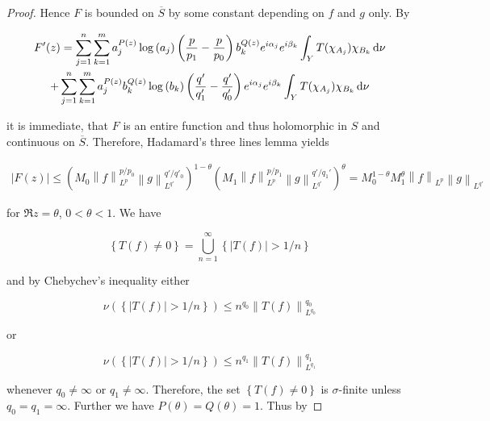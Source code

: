 \begin{proof}
Hence $F$ is bounded on $\overline{S}$ by some constant depending on $f$ and $g$ only. By 

\begin{multline*}
	F'(z) = \sum_{j = 1}^n\sum_{k = 1}^m a^{P(z)}_j\log \left( a_j \right) \left( \frac{p}{p_1} - \frac{p}{p_0} \right) b_k^{Q(z)}e^{i\alpha_j} e^{i\beta_k} \int_YT(\chi_{A_j})\chi_{B_k}\mathop{}\!\mathrm{d}\nu \\
	+  \sum_{j = 1}^n\sum_{k = 1}^m a^{P(z)}_jb_k^{Q(z)}\log\left( b_k \right)\left( \frac{q'}{q'_1} - \frac{q'}{q'_0} \right)e^{i\alpha_j} e^{i\beta_k} \int_YT(\chi_{A_j})\chi_{B_k}\mathop{}\!\mathrm{d}\nu 
\end{multline*}

\noindent it is immediate, that $F$ is an entire function and thus holomorphic in $S$ and continuous on $\overline{S}$. Therefore, Hadamard's three lines lemma yields

\begin{gather*}
	\left| F(z) \right| \leq \left( M_0  \left\|f\right\|_{L^p}^{p/p_0} \left\|g\right\|_{L^{q'}}^{q'/q'_0} \right)^{1 - \theta}\left(  M_1 \left\|f\right\|_{L^p}^{p/p_1}\left\|g\right\|_{L^{q'}}^{q'/q_1'} \right)^\theta = M_0^{1 - \theta}M_1^\theta \left\|f\right\|_{L^p}\left\|g\right\|_{L^{q'}}
\end{gather*}

\noindent for $\Re z = \theta$, $0 < \theta < 1$. We have

\begin{equation*}
	\left\{ T(f) \neq 0\right\} = \bigcup_{n = 1}^\infty \left\{ \left| T(f)\right| > 1/n\right\}
\end{equation*}

\noindent and by Chebychev's inequality either

\begin{equation*}
	\nu\left( \left\{ \left| T(f)\right| > 1/n\right\} \right) \leq n^{q_0}\left\| T(f)\right\|_{L^{q_0}}^{q_0}
\end{equation*}

\noindent or

\begin{equation*}
	\nu\left( \left\{ \left| T(f)\right| > 1/n\right\} \right) \leq n^{q_1}\left\| T(f)\right\|_{L^{q_1}}^{q_1}
\end{equation*}

\noindent whenever $q_0 \neq \infty$ or $q_1 \neq \infty$. Therefore, the set $\left\{ T(f) \neq 0\right\}$ is $\sigma$-finite unless $q_0 = q_1 = \infty$. Further we have $P(\theta) = Q(\theta) = 1$. Thus by


\end{proof}
